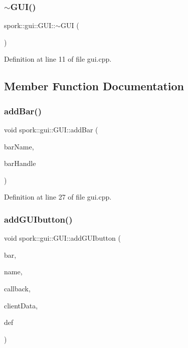 \subsubsection{\texorpdfstring{$\sim$\+G\+U\+I()}{~GUI()}}
{\footnotesize\ttfamily spork\+::gui\+::\+G\+U\+I\+::$\sim$\+G\+UI (\begin{DoxyParamCaption}{ }\end{DoxyParamCaption})}



Definition at line 11 of file gui.\+cpp.



\subsection{Member Function Documentation}
\mbox{\label{classspork_1_1gui_1_1_g_u_i_ad931ff397620434803152efafb65f199}} 
\subsubsection{\texorpdfstring{add\+Bar()}{addBar()}}
{\footnotesize\ttfamily void spork\+::gui\+::\+G\+U\+I\+::add\+Bar (\begin{DoxyParamCaption}\item[{Tw\+Bar $\ast$}]{bar\+Name,  }\item[{const char $\ast$}]{bar\+Handle }\end{DoxyParamCaption})}



Definition at line 27 of file gui.\+cpp.

\mbox{\label{classspork_1_1gui_1_1_g_u_i_a2e6dcd5011c7bbe5607c2ec126e5f080}} 
\subsubsection{\texorpdfstring{add\+G\+U\+Ibutton()}{addGUIbutton()}}
{\footnotesize\ttfamily void spork\+::gui\+::\+G\+U\+I\+::add\+G\+U\+Ibutton (\begin{DoxyParamCaption}\item[{Tw\+Bar $\ast$}]{bar,  }\item[{const char $\ast$}]{name,  }\item[{Tw\+Button\+Callback}]{callback,  }\item[{void $\ast$}]{client\+Data,  }\item[{const char $\ast$}]{def }\end{DoxyParamCaption})}



